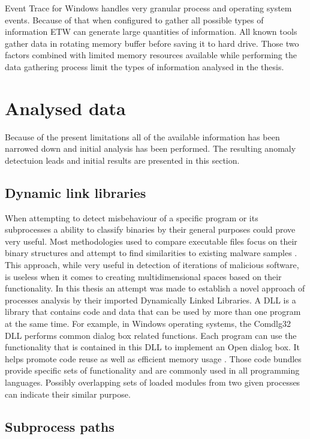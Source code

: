 \documentclass[a4paper,twoside,12pt]{book}
\begin{document}
Event Trace for Windows handles very granular process and operating system events.
Because of that when configured to gather all possible types of information ETW can generate
large quantities of information. All known tools gather data in rotating memory buffer 
before saving it to hard drive. Those two factors combined with limited memory resources 
available while performing the data gathering process limit the types of information analysed 
in the thesis. 



\section{Analysed data}
Because of the present limitations all of the available information has been narrowed down and 
initial analysis has been performed. The resulting anomaly detectuion leads and initial 
results are presented in this section.

\subsection{Dynamic link libraries}

When attempting to detect misbehaviour of a specific program or its subprocesses a ability to 
classify binaries by their general purposes could prove very useful. Most methodologies used to 
compare executable files focus on their binary structures and attempt to find similarities to 
existing malware samples \cite{bib:malwclass}. This approach, while very useful in detection of 
iterations of malicious software, is useless when it comes to creating multidimensional spaces 
based on their functionality. In this thesis an attempt was made to establish a novel approach of 
processes analysis by their imported Dynamically Linked Libraries. A DLL is a library that 
contains code and data that can be used by more than one program at the same time. For example, 
in Windows operating systems, the Comdlg32 DLL performs common dialog box related functions. Each 
program can use the functionality that is contained in this DLL to implement an Open dialog box. 
It helps promote code reuse as well as efficient memory usage \cite{bib:dll}. Those code bundles provide 
specific sets of functionality and are commonly used in all programming languages. Possibly 
overlapping sets of loaded modules from two given processes can indicate their similar purpose. 

\subsection{Subprocess paths}
\end{document}
